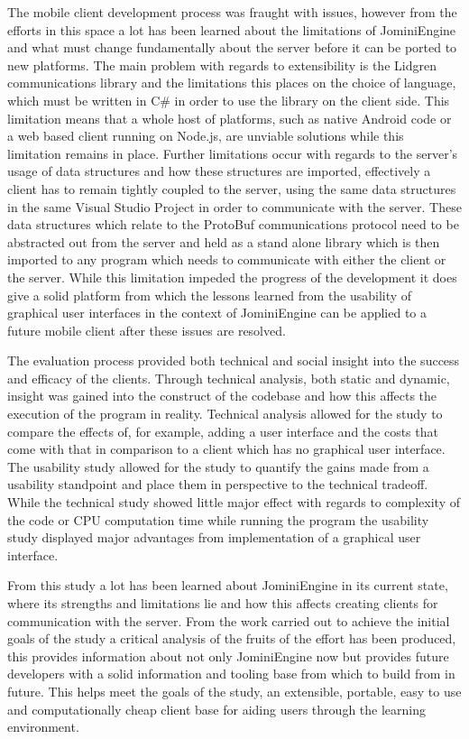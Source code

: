 \documentclass{article}
\begin{document}
The mobile client development process was fraught with issues, however from the efforts in this space a lot has been learned about the limitations of JominiEngine and what must change fundamentally about the server before it can be ported to new platforms. The main problem with regards to extensibility is the Lidgren communications library and the limitations this places on the choice of language, which must be written in C\# in order to use the library on the client side. This limitation means that a whole host of platforms, such as native Android code or a web based client running on Node.js, are unviable solutions while this limitation remains in place. Further limitations occur with regards to the server’s usage of data structures and how these structures are imported, effectively a client has to remain tightly coupled to the server, using the same data structures in the same Visual Studio Project in order to communicate with the server. These data structures which relate to the ProtoBuf communications protocol need to be abstracted out from the server and held as a stand alone library which is then imported to any program which needs to communicate with either the client or the server. While this limitation impeded the progress of the development it does give a solid platform from which the lessons learned from the usability of graphical user interfaces in the context of JominiEngine can be applied to a future mobile client after these issues are resolved.

The evaluation process provided both technical and social insight into the success and efficacy of the clients. Through technical analysis, both static and dynamic, insight was gained into the construct of the codebase and how this affects the execution of the program in reality. Technical analysis allowed for the study to compare the effects of, for example, adding a user interface and the costs that come with that in comparison to a client which has no graphical user interface. The usability study allowed for the study to quantify the gains made from a usability standpoint and place them in perspective to the technical tradeoff. While the technical study showed little major effect with regards to complexity of the code or CPU computation time while running the program the usability study displayed major advantages from implementation of a graphical user interface.

From this study a lot has been learned about JominiEngine in its current state, where its strengths and limitations lie and how this affects creating clients for communication with the server. From the work carried out to achieve the initial goals of the study a critical analysis of the fruits of the effort has been produced, this provides information about not only JominiEngine now but provides future developers with a solid information and tooling base from which to build from in future. This helps meet the goals of the study, an extensible, portable, easy to use and computationally cheap client base for aiding users through the learning environment.
\end{document}
